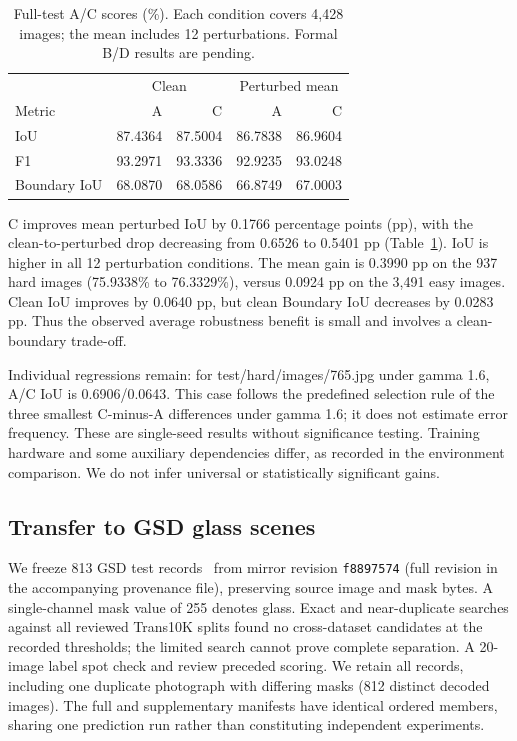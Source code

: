 \begin{table}[t]
\centering
\small
\setlength{\tabcolsep}{3pt}
\begin{tabular}{lrrrr}
\hline
 & \multicolumn{2}{c}{Clean} & \multicolumn{2}{c}{Perturbed mean} \\
Metric & A & C & A & C \\
\hline
IoU & 87.4364 & 87.5004 & 86.7838 & 86.9604 \\
F1 & 93.2971 & 93.3336 & 92.9235 & 93.0248 \\
Boundary IoU & 68.0870 & 68.0586 & 66.8749 & 67.0003 \\
\hline
\end{tabular}
\caption{Full-test A/C scores (\%). Each condition covers 4,428 images;
the mean includes 12 perturbations. Formal B/D results are pending.}
\label{tab:member4-ac}
\end{table}

C improves mean perturbed IoU by 0.1766 percentage points (pp), with the
clean-to-perturbed drop decreasing from 0.6526 to 0.5401 pp
(Table~\ref{tab:member4-ac}). IoU is higher in all 12 perturbation conditions.
The mean gain is 0.3990 pp on the 937 hard images (75.9338\% to 76.3329\%),
versus 0.0924 pp on the 3,491 easy images. Clean IoU improves by 0.0640 pp,
but clean Boundary IoU decreases by 0.0283 pp. Thus the observed average
robustness benefit is small and involves a clean-boundary trade-off.

Individual regressions remain: for test/hard/images/765.jpg under gamma 1.6,
A/C IoU is 0.6906/0.0643. This case follows the predefined selection rule of
the three smallest C-minus-A differences under gamma 1.6; it does not
estimate error frequency. These are single-seed results without significance
testing. Training hardware and some auxiliary dependencies differ, as recorded
in the environment comparison. We do not infer universal or statistically
significant gains.

\subsection{Transfer to GSD glass scenes}
We freeze 813 GSD test records~\cite{lin2021glass} from mirror revision
\texttt{f8897574} (full revision in the accompanying provenance file),
preserving source image and mask bytes. A single-channel mask value of 255
denotes glass. Exact and near-duplicate searches against all reviewed
Trans10K splits found no cross-dataset candidates at the recorded thresholds;
the limited search cannot prove complete separation. A 20-image label spot
check and review preceded scoring. We retain all records, including one
duplicate photograph with differing masks (812 distinct decoded images).
The full and supplementary manifests have identical ordered members, sharing
one prediction run rather than constituting independent experiments.

